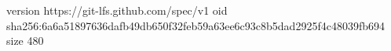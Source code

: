 version https://git-lfs.github.com/spec/v1
oid sha256:6a6a51897636dafb49db650f32feb59a63ee6c93c8b5dad2925f4c48039fb694
size 480
